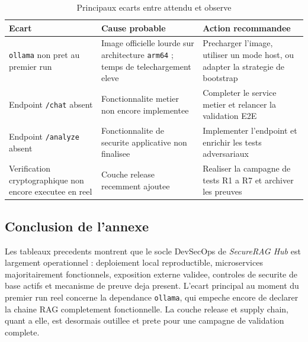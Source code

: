 \begin{table}[h]
\centering
\begin{tabular}{|p{4.1cm}|p{5.2cm}|p{4.0cm}|}
\hline
\textbf{Ecart} & \textbf{Cause probable} & \textbf{Action recommandee} \\
\hline
\texttt{ollama} non pret au premier run & Image officielle lourde sur architecture \texttt{arm64} ; temps de telechargement eleve & Precharger l'image, utiliser un mode host, ou adapter la strategie de bootstrap \\
\hline
Endpoint \texttt{/chat} absent & Fonctionnalite metier non encore implementee & Completer le service metier et relancer la validation E2E \\
\hline
Endpoint \texttt{/analyze} absent & Fonctionnalite de securite applicative non finalisee & Implementer l'endpoint et enrichir les tests adversariaux \\
\hline
Verification cryptographique non encore executee en reel & Couche release recemment ajoutee & Realiser la campagne de tests R1 a R7 et archiver les preuves \\
\hline
\end{tabular}
\caption{Principaux ecarts entre attendu et observe}
\end{table}

\subsection{Conclusion de l'annexe}

Les tableaux precedents montrent que le socle DevSecOps de \textit{SecureRAG Hub} est largement operationnel : deploiement local reproductible, microservices majoritairement fonctionnels, exposition externe validee, controles de securite de base actifs et mecanisme de preuve deja present. L'ecart principal au moment du premier run reel concerne la dependance \texttt{ollama}, qui empeche encore de declarer la chaine RAG completement fonctionnelle. La couche release et supply chain, quant a elle, est desormais outillee et prete pour une campagne de validation complete.
